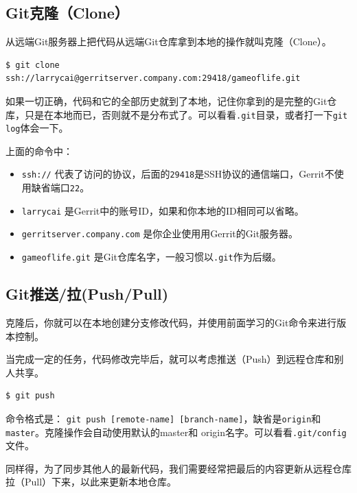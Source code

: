 \subsection{Git克隆（Clone）}
\label{git克隆（clone）}

从远端Git服务器上把代码从远端Git仓库拿到本地的操作就叫克隆（Clone）。

\begin{verbatim}
$ git clone ssh://larrycai@gerritserver.company.com:29418/gameoflife.git
\end{verbatim}

如果一切正确，代码和它的全部历史就到了本地，记住你拿到的是完整的Git仓库，只是在本地而已，否则就不是分布式了。可以看看\texttt{.git}目录，或者打一下\texttt{git log}体会一下。

上面的命令中：

\begin{itemize}
\item \texttt{ssh:/\slash } 代表了访问的协议，后面的\texttt{29418}是SSH协议的通信端口，Gerrit不使用缺省端口\texttt{22}。

\item \texttt{larrycai} 是Gerrit中的账号ID，如果和你本地的ID相同可以省略。

\item \texttt{gerritserver.company.com} 是你企业使用用Gerrit的Git服务器。

\item \texttt{gameoflife.git} 是Git仓库名字，一般习惯以\texttt{.git}作为后缀。

\end{itemize}

\subsection{Git推送\slash 拉(Push\slash Pull)}
\label{git推送拉pushpull}

克隆后，你就可以在本地创建分支修改代码，并使用前面学习的Git命令来进行版本控制。

当完成一定的任务，代码修改完毕后，就可以考虑推送（Push）到远程仓库和别人共享。

\begin{verbatim}
$ git push 
\end{verbatim}

命令格式是： \texttt{git push [remote-name] [branch-name]}，缺省是\texttt{origin}和\texttt{master}。克隆操作会自动使用默认的master和 origin名字。可以看看\texttt{.git\slash config}文件。

同样得，为了同步其他人的最新代码，我们需要经常把最后的内容更新从远程仓库拉（Pull）下来，以此来更新本地仓库。

